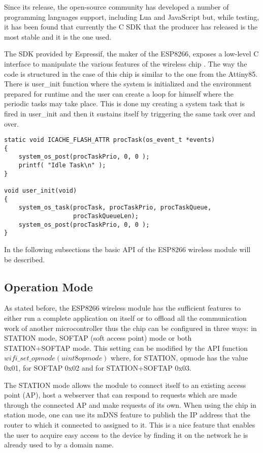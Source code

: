 Since its release, the open-source community has developed a number of programming languages support,
including  Lua \cite{website:nodemcu} and JavaScript \cite{website:espruino} but, while testing, it has been
found that currently the C SDK that the producer has released is the most stable and it is the one used.

The SDK provided by Espressif, the maker of the ESP8266, exposes a low-level C interface to manipulate the
various features of the wireless chip \cite{datasheet:esp8266_api}.
The way the code is structured in the case of this chip is similar to the one from the Attiny85. There is
user\_init function where the system is initialized and the environment prepared for runtime and the user
can create a loop for himself where the periodic tasks may take place.
This is done my creating a system task that is fired in user\_init and then it sustains itself by triggering
the same task over and over.

\lstset{language=C}
\begin{lstlisting}[frame=single]
static void ICACHE_FLASH_ATTR procTask(os_event_t *events)
{
    system_os_post(procTaskPrio, 0, 0 );
    printf( "Idle Task\n" );
}

void user_init(void)
{
    system_os_task(procTask, procTaskPrio, procTaskQueue,
                   procTaskQueueLen);
    system_os_post(procTaskPrio, 0, 0 );
}
\end{lstlisting}

In the following subsections the basic API of the ESP8266 wireless module will be described.

\subsection{Operation Mode}
\label{sec:opmode}

As stated before, the ESP8266 wireless module has the sufficient features to either run a complete application
on itself or to offload all the communication work of another microcontroller thus the chip can be configured
in  three ways: in STATION mode, SOFTAP (soft access point) mode or both STATION+SOFTAP mode.
This setting can be modified by the API function $wifi\_set\_opmode(uint8 opmode)$ where, for STATION, opmode
has the value 0x01, for SOFTAP 0x02 and for STATION+SOFTAP 0x03.

The STATION mode allows the module to connect itself to an existing access point (AP), host a webserver that
can respond to requests which are made through the connected AP and make requests of its own. When using the
chip in station mode, one can use its mDNS feature to publish the IP address that the router to which it
connected to assigned to it. This is a nice feature that enables the user to acquire easy access to the device
by finding it on the network he is already used to by a domain name.

